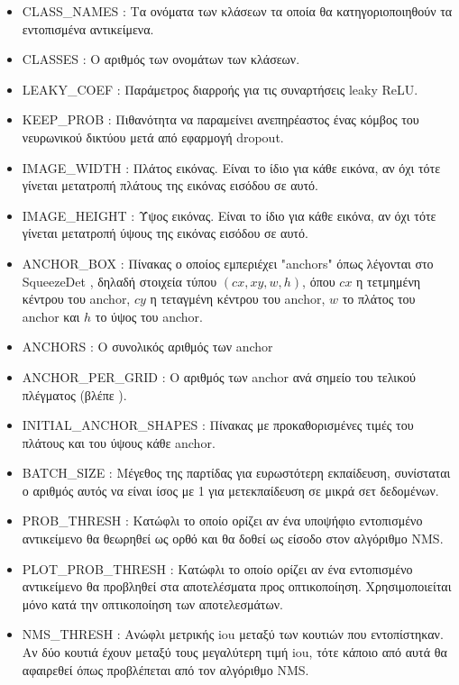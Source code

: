 \begin{itemize}
\setlength{\itemsep}{0pt}
\item \textcolor{LstItemCol}{CLASS\_NAMES} : Τα ονόματα των κλάσεων τα οποία θα κατηγοριοποιηθούν τα εντοπισμένα αντικείμενα.
\item \textcolor{LstItemCol}{CLASSES} : Ο αριθμός των ονομάτων των κλάσεων.
\item \textcolor{LstItemCol}{LEAKY\_COEF} : Παράμετρος διαρροής για τις συναρτήσεις leaky ReLU.
\item \textcolor{LstItemCol}{KEEP\_PROB} : Πιθανότητα να παραμείνει ανεπηρέαστος ένας κόμβος του νευρωνικού δικτύου μετά από εφαρμογή dropout.
\item \textcolor{LstItemCol}{IMAGE\_WIDTH} : Πλάτος εικόνας. Είναι το ίδιο για κάθε εικόνα, αν όχι τότε γίνεται μετατροπή πλάτους της εικόνας εισόδου σε αυτό.
\item \textcolor{LstItemCol}{IMAGE\_HEIGHT} : Ύψος εικόνας. Είναι το ίδιο για κάθε εικόνα, αν όχι τότε γίνεται μετατροπή ύψους της εικόνας εισόδου σε αυτό.
\item \textcolor{LstItemCol}{ANCHOR\_BOX} : Πίνακας ο οποίος εμπεριέχει "anchors" όπως λέγονται στο SqueezeDet \cite{1}, δηλαδή στοιχεία τύπου $(cx,xy,w,h)$, όπου $cx$ η τετμημένη κέντρου του anchor, $cy$ η τεταγμένη κέντρου του anchor, $w$ το πλάτος του anchor και $h$ το ύψος του anchor.
\item \textcolor{LstItemCol}{ANCHORS} : Ο συνολικός αριθμός των anchor
\item \textcolor{LstItemCol}{ANCHOR\_PER\_GRID} : Ο αριθμός των anchor ανά σημείο του τελικού πλέγματος (βλέπε \cite{1}).
\item \textcolor{LstItemCol}{INITIAL\_ANCHOR\_SHAPES} : Πίνακας με προκαθορισμένες τιμές του πλάτους και του ύψους κάθε anchor.
\item \textcolor{LstItemCol}{BATCH\_SIZE} : Μέγεθος της παρτίδας για ευρωστότερη εκπαίδευση, συνίσταται ο αριθμός αυτός να είναι ίσος με 1 για μετεκπαίδευση σε μικρά σετ δεδομένων.
\item \textcolor{LstItemCol}{PROB\_THRESH} : Κατώφλι το οποίο ορίζει αν ένα υποψήφιο εντοπισμένο αντικείμενο θα θεωρηθεί ως ορθό και θα δοθεί ως είσοδο στον αλγόριθμο NMS.
\item \textcolor{LstItemCol}{PLOT\_PROB\_THRESH} : Κατώφλι το οποίο ορίζει αν ένα εντοπισμένο αντικείμενο θα προβληθεί στα αποτελέσματα προς οπτικοποίηση. Χρησιμοποιείται μόνο κατά την οπτικοποίηση των αποτελεσμάτων.
\item \textcolor{LstItemCol}{NMS\_THRESH} : Ανώφλι μετρικής iou μεταξύ των κουτιών που εντοπίστηκαν. Αν δύο κουτιά έχουν μεταξύ τους μεγαλύτερη τιμή iou, τότε κάποιο από αυτά θα αφαιρεθεί όπως προβλέπεται από τον αλγόριθμο NMS.

\end{itemize}
